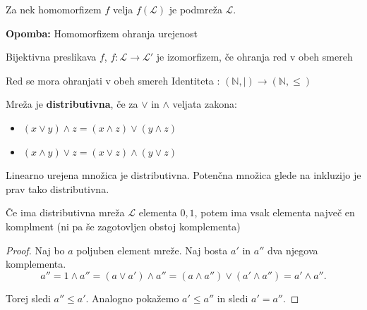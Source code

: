 \documentclass{beamer}
\newenvironment{remark}
{\textbf{Opomba:}}
{}
\begin{document}
\begin{frame}
\begin{theorem}
Za nek homomorfizem $f$ velja $f(\mathcal{L})$ je podmreža $\mathcal{L}$.
\end{theorem}

\begin{remark}
Homomorfizem ohranja urejenost
\end{remark}
\end{frame}


\begin{frame}

\begin{theorem}
Bijektivna preslikava $f$, $f : \mathcal{L} \to \mathcal{L}'$ je izomorfizem, če ohranja red v obeh smereh
\end{theorem}

\begin{block}{Red se mora ohranjati v obeh smereh}
Identiteta : $(\mathbb{N}, |)  \to (\mathbb{N}, \leq) $
\end{block}
\end{frame}

\begin{frame}
\begin{definition}
Mreža je \textbf{distributivna}, če za $\lor$ in $\land$ veljata zakona:
\begin{itemize}
\item $(x \lor y) \land z = (x \land z) \lor (y \land z)$
\item $(x \land y) \lor z = (x \lor z) \land (y \lor z)$
\end{itemize}
\end{definition}


\begin{example}
Linearno urejena množica je distributivna.
Potenčna množica glede na inkluzijo je prav tako distributivna.
\end{example}

\end{frame}

\begin{frame}
\begin{theorem}
Če ima distributivna mreža $\mathcal{L}$ elementa $0,1$, potem ima vsak elementa največ en komplment (ni pa še zagotovljen obstoj komplementa)
\end{theorem}

\begin{proof}
Naj bo $a$ poljuben element mreže. Naj bosta $a'$ in $a''$ dva njegova komplementa.\\
$$ a'' = 1 \land a'' = (a \lor a') \land a'' = (a  \land a'') \lor (a' \land a'') =  a' \land a''. $$

Torej sledi $ a'' \leq a'$. Analogno pokažemo $a' \leq a''$ in sledi $ a' = a''.$

\end{proof}

\end{frame}
\end{document}
